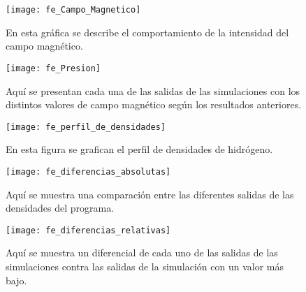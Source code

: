 \begin{figure}[h]
\centering
\texttt{[image: fe\_Campo\_Magnetico]}
\caption{ En esta gr\'afica se describe el comportamiento de la intensidad del campo magn\'etico. }
\label{fe_Campo_Magnetico}
\end{figure}

\begin{figure}[h]
\centering
\texttt{[image: fe\_Presion]}
\caption{ Aqu\'i se presentan cada una de las salidas de las simulaciones con los distintos valores de campo magn\'etico seg\'un los resultados anteriores.}
\end{figure}

\begin{figure}[h]
\centering
\texttt{[image: fe\_perfil\_de\_densidades]}
\caption{ En esta figura se grafican el perfil de densidades de hidr\'ogeno.}
\label{fe_perfil_de_densidades}
\end{figure}


\begin{figure}[h]
\centering
\texttt{[image: fe\_diferencias\_absolutas]}
\caption{ Aqu\'i se muestra una comparaci\'on entre las diferentes salidas de las densidades del programa.}
\label{fe_diferencias_absolutas}
\end{figure}

\begin{figure}[h]
\centering
\texttt{[image: fe\_diferencias\_relativas]}
\caption{ Aqu\'i se muestra un diferencial de cada uno de las salidas de las simulaciones contra las salidas de la simulaci\'on con un valor m\'as bajo.}
\label{fe_diferencias_relativas}
\end{figure}
\clearpage
